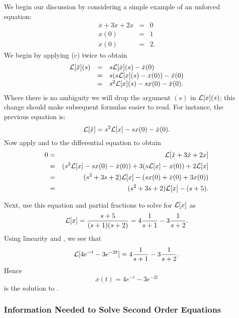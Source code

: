We begin our discussion by considering a simple example of an unforced 
equation:
\begin{equation}  \label{Lexam2}
\begin{array}{rcl}
\ddot{x} + 3\dot{x} +2x & = & 0  \\
 x(0) & = & 1 \\
\dot{x}(0) & = & 2.
\end{array}
\end{equation}
We begin by applying (c) twice to obtain
\[
\begin{array}{rcl}
{\cal L}[\ddot{x}](s) & = & s{\cal L}[\dot{x}](s) - \dot{x}(0)\\
& = & s(s{\cal L}[x](s) - x(0)) - \dot{x}(0)\\
& = & s^2{\cal L}[x](s) - sx(0) - \dot{x}(0).
\end{array}
\]
Where there is no ambiguity we will drop the argument $(s)$ in 
${\cal L}[x](s)$; this change should make subsequent formulas easier 
to read.  For instance, the previous equation is:
\begin{equation}  \label{eq:dderLap}
{\cal L}[\ddot{x}] = s^2{\cal L}[x] - sx(0) - \dot{x}(0).
\end{equation}
Now apply  and  to the differential
equation  to obtain
\begin{eqnarray*}
0 & = & {\cal L}[\ddot{x} + 3\dot{x} +2x] \\
& = & (s^2{\cal L}[x] - sx(0) - \dot{x}(0)) + 
3(s{\cal L}[x] - x(0)) + 2{\cal L}[x]\\
& = & (s^2+3s+2){\cal L}[x] -(sx(0)+\dot{x}(0)+3x(0)) \\
& = & (s^2+3s+2){\cal L}[x] - (s+5).
\end{eqnarray*}

Next, use this equation and partial fractions to solve for ${\cal L}[x]$ as
\[
\displaystyle{\cal L}[x] = \frac{s+5}{(s+1)(s+2)} = 4\frac{1}{s+1} - 3\frac{1}{s+2}.
\]
Using linearity and , we see that 
\[
{\cal L}[4e^{-t}-3e^{-2t}] = 4\frac{1}{s+1} - 3\frac{1}{s+2}.
\]
Hence
\[
x(t) = 4e^{-t}-3e^{-2t}
\]
is the solution to .


\subsubsection*{Information Needed to Solve Second Order Equations}

